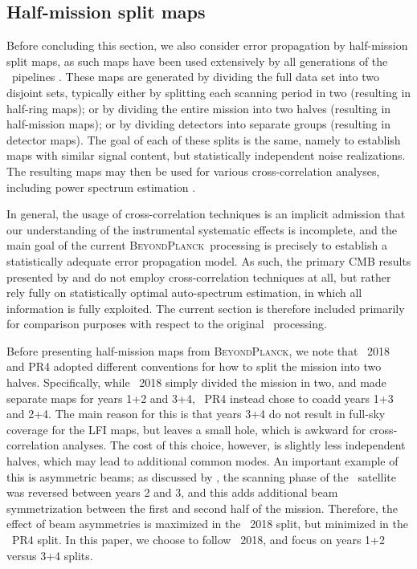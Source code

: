 \documentclass[twocolumn]{aa}
\newcommand{\BP}{\textsc{BeyondPlanck}}
\begin{document}
\subsection{Half-mission split maps}

Before concluding this section, we also consider error propagation by
half-mission split maps, as such maps have been used extensively by
all generations of the \Planck\ pipelines
\citep{planck2013-p01,planck2014-a01,planck2016-l01}. These maps are
generated by dividing the full data set into two disjoint sets,
typically either by splitting each scanning period in two (resulting
in half-ring maps); or by dividing the entire mission into two halves
(resulting in half-mission maps); or by dividing detectors into
separate groups (resulting in detector maps). The goal of each of
these splits is the same, namely to establish maps with similar signal
content, but statistically independent noise realizations. The
resulting maps may then be used for various cross-correlation
analyses, including power spectrum estimation
\citep[e.g.,][]{planck2016-l05}.

In general, the usage of cross-correlation techniques is an implicit
admission that our understanding of the instrumental systematic
effects is incomplete, and the main goal of the current
\BP\ processing is precisely to establish a statistically adequate
error propagation model. As such, the primary CMB results presented by
\citet{bp11} and \citet{bp12} do not employ cross-correlation techniques at all,
but rather rely fully on statistically optimal auto-spectrum
estimation, in which all information is fully exploited. The current
section is therefore included primarily for comparison purposes with
respect to the original \Planck\ processing.

Before presenting half-mission maps from \BP, we note that
\Planck\ 2018 and PR4 adopted different conventions for how
to split the mission into two halves. Specifically, while \Planck\ 2018
simply divided the mission in two, and made separate maps for years
1+2 and 3+4, \Planck\ PR4 instead chose to coadd years 1+3 and
2+4. The main reason for this is that years 3+4 do not result in 
full-sky coverage for the LFI maps, but leaves a small hole, which is
awkward for cross-correlation analyses. The cost of this choice,
however, is slightly less independent halves, which may lead to
additional common modes. An important example of this is asymmetric
beams; as discussed by \citet{planck2014-a01}, the scanning phase of
the \Planck\ satellite was reversed between years 2 and 3, and this
adds additional beam symmetrization between the first and second half
of the mission. Therefore, the effect of beam asymmetries is
maximized in the \Planck\ 2018 split, but minimized in the
\Planck\ PR4 split. In this paper, we choose to follow \Planck\ 2018,
and focus on years 1+2 versus 3+4 splits.
\end{document}
